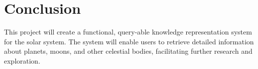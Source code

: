\documentclass{article}
\begin{document}

\section{Conclusion}
This project will create a functional, query-able knowledge representation system for the solar system. The system will enable users to retrieve detailed information about planets, moons, and other celestial bodies, facilitating further research and exploration.
\end{document}
